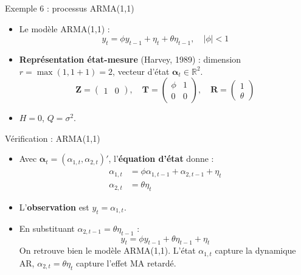 \documentclass[11pt,aspectratio=169]{beamer}
\newcommand{\R}{\mathbb{R}}
\begin{document}
\begin{frame}{Exemple 6 : processus ARMA(1,1)}

\begin{itemize}

\item Le modèle ARMA(1,1) :
  \[
  y_t = \phi y_{t-1} + \eta_t + \theta \eta_{t-1}, \quad |\phi| < 1
  \]\newline

\item \textbf{Représentation état-mesure} (Harvey, 1989) : dimension $r = \max(1, 1+1) = 2$, vecteur d'état $\bm{\alpha}_t \in \R^2$.
  \[
  \bm{Z} = \begin{pmatrix} 1 & 0 \end{pmatrix}, \quad
  \bm{T} = \begin{pmatrix} \phi & 1 \\ 0 & 0 \end{pmatrix}, \quad
  \bm{R} = \begin{pmatrix} 1 \\ \theta \end{pmatrix}
  \]\newline

\item $H = 0$, $Q = \sigma^2$.

\end{itemize}

\end{frame}

\begin{frame}{Vérification : ARMA(1,1)}

\begin{itemize}

\item Avec $\bm{\alpha}_t = (\alpha_{1,t}, \alpha_{2,t})'$, l'\textbf{équation d'état} donne :
  \begin{align*}
  \alpha_{1,t} &= \phi \alpha_{1,t-1} + \alpha_{2,t-1} + \eta_t \\
  \alpha_{2,t} &= \theta \eta_t
  \end{align*}\newline

\item L'\textbf{observation} est $y_t = \alpha_{1,t}$.\newline

\item En substituant $\alpha_{2,t-1} = \theta \eta_{t-1}$ :
  \[
  y_t = \phi y_{t-1} + \theta \eta_{t-1} + \eta_t
  \]
  On retrouve bien le modèle ARMA(1,1). L'état $\alpha_{1,t}$ capture la dynamique AR, $\alpha_{2,t} = \theta\eta_t$ capture l'effet MA retardé.

\end{itemize}

\end{frame}
\end{document}
